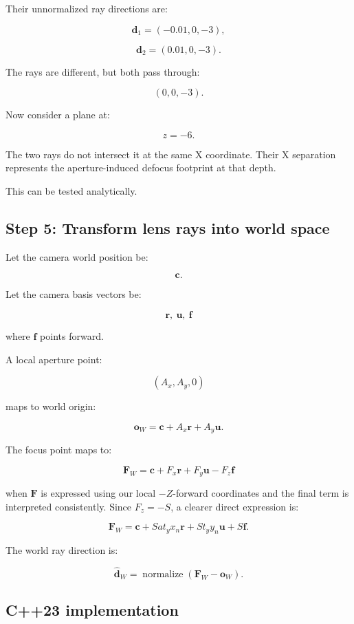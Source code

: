 Their unnormalized ray directions are:

\[ \mathbf d_1=(-0.01,0,-3), \]

\[ \mathbf d_2=(0.01,0,-3). \]

The rays are different, but both pass through:

\[ (0,0,-3). \]

Now consider a plane at:

\[ z=-6. \]

The two rays do not intersect it at the same X coordinate. Their X separation represents the aperture-induced defocus footprint at that depth.

This can be tested analytically.

\subsection{Step 5: Transform lens rays into world space}\label{02-foundations-ii-ch036-step-5-transform-lens-rays-into-world-space}

Let the camera world position be:

\[ \mathbf c. \]

Let the camera basis vectors be:

\[ \mathbf r,\ \mathbf u,\ \mathbf f \]

where \(\mathbf f\) points forward.

A local aperture point:

\[ (A_x,A_y,0) \]

maps to world origin:

\[ \boxed{ \mathbf o_W= \mathbf c+A_x\mathbf r+A_y\mathbf u. } \]

The focus point maps to:

\[ \boxed{ \mathbf F_W= \mathbf c+ F_x\mathbf r+ F_y\mathbf u- F_z\mathbf f } \]

when \(\mathbf F\) is expressed using our local \(-Z\)-forward coordinates and the final term is interpreted consistently. Since \(F_z=-S\), a clearer direct expression is:

\[ \boxed{ \mathbf F_W= \mathbf c+ Sa t_yx_n\mathbf r+ St_yy_n\mathbf u+ S\mathbf f. } \]

The world ray direction is:

\[ \boxed{ \hat{\mathbf d}_W= \operatorname{normalize}(\mathbf F_W-\mathbf o_W). } \]

\subsection{C++23 implementation}\label{02-foundations-ii-ch036-c23-implementation}

